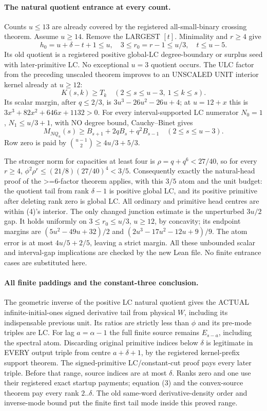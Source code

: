 \paragraph{The natural quotient entrance at every count.}
Counts $u\le13$ are already covered by the registered all-small-binary
crossing theorem. Assume $u\ge14$. Remove the LARGEST $[t]$.
Minimality and $r\ge4$ give
\[
 h_0=u+\delta-t+1\le u,\quad 3\le r_0=r-1\le u/3,
                           \quad t\le u-5.          \tag{4}
\]
Its old quotient is a registered positive global-LC degree-boundary
or surplus seed with later-primitive LC. No exceptional $u=3$
quotient occurs.
The ULC factor from the preceding unscaled theorem improves to
an UNSCALED UNIT interior kernel already at $u\ge12$:
\[
 K(s,k)\ge T_k\quad(2\le s\le u-3,\ 1\le k\le s).
\]
Its scalar margin, after $q\le2/3$, is
$3u^3-26u^2-26u+4$; at $u=12+x$ this is
$3x^3+82x^2+646x+1132>0$.
For every interval-supported LC numerator $N_0=1$,
$N_1\le u/3+1$, with NO degree bound, Cauchy--Binet gives
\[
 M_{NQ_u}(s)\ge B_{s+1}+2qB_s+q^2B_{s-1}
                                  \quad(2\le s\le u-3).
\]
Row zero is paid by $\binom{u-1}{2}\ge4u/3+5/3$.

The stronger norm for capacities at least four is
$\rho=q+q^6<27/40$, so for every $r\ge4$,
$\phi^2\rho^r\le(21/8)(27/40)^4<3/5$.
Consequently exactly the natural-head proof of the >=6-factor theorem
applies, with this $3/5$ atom and the unit budget:
the quotient tail from rank $\delta-1$ is positive global LC,
and its positive primitive after deleting rank zero is global LC.
All ordinary and primitive head centres are within (4)'s interior.
The only changed junction estimate is the unperturbed $3u/2$ gap.
It holds uniformly on $3\le r_0\le u/3$, $u\ge12$, by concavity;
its endpoint margins are
$(5u^2-49u+32)/2$ and $(2u^3-17u^2-12u+9)/9$.
The atom error is at most $4u/5+2/5$, leaving a strict margin.
All these unbounded scalar and interval-gap implications are checked
by the new Lean file. No finite entrance cases are substituted here.

\paragraph{All finite paddings and the constant-three conclusion.}
The geometric inverse of the positive LC natural quotient gives the
ACTUAL infinite-initial-ones signed derivative tail from physical
$W$, including its indispensable previous unit. Its ratios are
strictly less than $\phi$ and its pre-mode triples are LC.
For lag $a=\alpha-1$ the full finite source remains $E_{s-a}$,
including the spectral atom. Discarding original primitive indices
below $\delta$ is legitimate in EVERY output triple from centre
$a+\delta+1$, by the registered kernel-prefix support theorem.
The signed-primitive LC/constant-cut proof pays every later triple.
Before that range, source indices are at most $\delta$.
Ranks zero and one use their registered exact startup payments;
equation (3) and the convex-source theorem pay every rank $2..\delta$.
The old same-word derivative-density order and inverse-mode bound
put the finite first tail mode inside this proved range.

